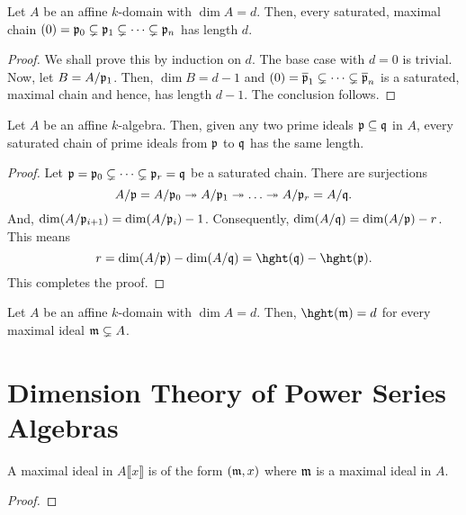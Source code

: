 \begin{proposition}
    Let $A$ be an affine $k$-domain with $\dim A = d$. Then, every saturated, maximal chain $(0) = \mathfrak p_0\subsetneq\mathfrak p_1\subsetneq\dots\subsetneq\mathfrak p_n$ has length $d$.
\end{proposition}
\begin{proof}
    We shall prove this by induction on $d$. The base case with $d = 0$ is trivial. Now, let $B = A/\mathfrak p_1$. Then, $\dim B = d - 1$ and $(0) = \overline{\mathfrak p}_1\subsetneq\dots\subsetneq\overline{\mathfrak p}_n$ is a saturated, maximal chain and hence, has length $d - 1$. The conclusion follows.
\end{proof}

\begin{theorem}
    Let $A$ be an affine $k$-algebra. Then, given any two prime ideals $\mathfrak p\subseteq\mathfrak q$ in $A$, every saturated chain of prime ideals from $\mathfrak p$ to $\mathfrak q$ has the same length.
\end{theorem}
\begin{proof}
    Let $\mathfrak p = \mathfrak p_0\subsetneq\dots\subsetneq\mathfrak p_r = \mathfrak q$ be a saturated chain. There are surjections 
    \begin{equation*}
        A/\frakp = A/\frakp_0\onto A/\frakp_1\onto\dots\onto A/\frakp_r = A/\frakq.
    \end{equation*}
    And, $\dim(A/\mathfrak p_{i + 1}) = \dim(A/\mathfrak p_i) - 1$. Consequently, $\dim(A/\mathfrak q) = \dim(A/\mathfrak p) - r$. This means 
    \begin{equation*}
        r = \dim(A/\frakp) - \dim(A/\frakq) = \hght(\frakq) - \hght(\frakp).
    \end{equation*}
    This completes the proof.
\end{proof}

\begin{corollary}
    Let $A$ be an affine $k$-domain with $\dim A = d$. Then, $\hght(\frakm) = d$ for every maximal ideal $\mathfrak m\subsetneq A$.
\end{corollary}

\section{Dimension Theory of Power Series Algebras}

\begin{lemma}
    A maximal ideal in $A\llbracket x\rrbracket$ is of the form $(\mathfrak m, x)$ where $\mathfrak m$ is a maximal ideal in $A$.
\end{lemma}
\begin{proof}
\end{proof}

